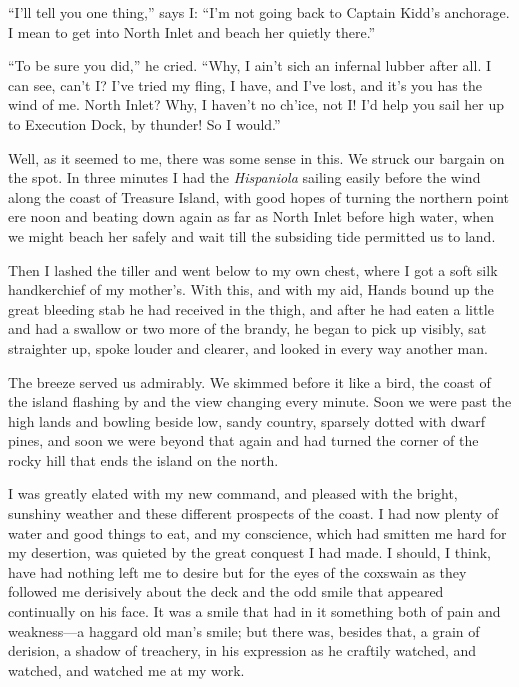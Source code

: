 \enquote{I’ll tell you one thing,} says I: \enquote{I’m not going back to Captain Kidd’s anchorage. I mean to get into North Inlet and beach her quietly there.}

\enquote{To be sure you did,} he cried. \enquote{Why, I ain’t sich an infernal lubber after all. I can see, can’t I? I’ve tried my fling, I have, and I’ve lost, and it’s you has the wind of me. North Inlet? Why, I haven’t no ch’ice, not I! I’d help you sail her up to Execution Dock, by thunder! So I would.}

Well, as it seemed to me, there was some sense in this. We struck our bargain on the spot. In three minutes I had the \textit{Hispaniola} sailing easily before the wind along the coast of Treasure Island, with good hopes of turning the northern point ere noon and beating down again as far as North Inlet before high water, when we might beach her safely and wait till the subsiding tide permitted us to land.

Then I lashed the tiller and went below to my own chest, where I got a soft silk handkerchief of my mother’s. With this, and with my aid, Hands bound up the great bleeding stab he had received in the thigh, and after he had eaten a little and had a swallow or two more of the brandy, he began to pick up visibly, sat straighter up, spoke louder and clearer, and looked in every way another man.

The breeze served us admirably. We skimmed before it like a bird, the coast of the island flashing by and the view changing every minute. Soon we were past the high lands and bowling beside low, sandy country, sparsely dotted with dwarf pines, and soon we were beyond that again and had turned the corner of the rocky hill that ends the island on the north.

I was greatly elated with my new command, and pleased with the bright, sunshiny weather and these different prospects of the coast. I had now plenty of water and good things to eat, and my conscience, which had smitten me hard for my desertion, was quieted by the great conquest I had made. I should, I think, have had nothing left me to desire but for the eyes of the coxswain as they followed me derisively about the deck and the odd smile that appeared continually on his face. It was a smile that had in it something both of pain and weakness---a haggard old man’s smile; but there was, besides that, a grain of derision, a shadow of treachery, in his expression as he craftily watched, and watched, and watched me at my work.